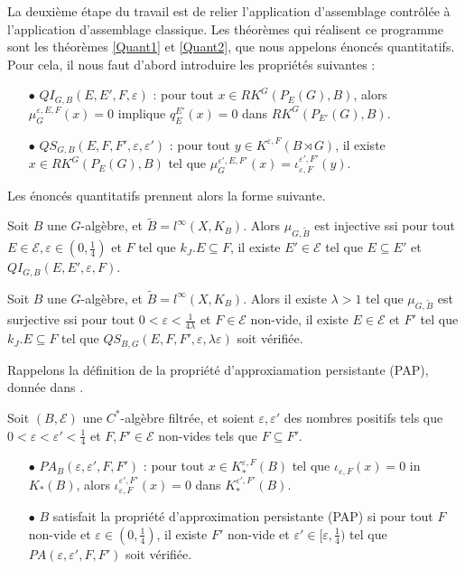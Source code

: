 La deuxième étape du travail est de relier l'application d'assemblage contrôlée à l'application d'assemblage classique. Les théorèmes qui réalisent ce programme sont les théorèmes \ref{Quant1} et \ref{Quant2}, que nous appelons énoncés quantitatifs. Pour cela, il nous faut d'abord introduire les propriétés suivantes :
\begin{itemize}
\item[$\bullet$] $QI_{G,B}(E,E',F,\varepsilon)$ : pour tout $x\in RK^G(P_E(G), B )$, alors $\mu^{\varepsilon,E,F}_G(x) = 0$ implique $q_E^{E'}(x)=0$ dans $RK^G(P_{E'}(G),B)$.
\item[$\bullet$] $QS_{G,B}(E,F,F',\varepsilon,\varepsilon')$ : pour tout $y\in K^{\varepsilon,F}(B\rtimes G)$, il existe $x\in RK^G(P_E(G),B)$ tel que $\mu^{\varepsilon',E,F'}_G(x)=\iota_{\varepsilon,F}^{\varepsilon',F'}(y)$.\\
\end{itemize} 

Les énoncés quantitatifs prennent alors la forme suivante.

\begin{thm}
Soit $B$ une $G$-algèbre, et $\tilde B = l^\infty(X,K_B)$. Alors $\mu_{G,\tilde B}$ est injective ssi pour tout $E\in\mathcal E,\varepsilon\in(0,\frac{1}{4})$ et $F$ tel que $k_J.E\subseteq F$, il existe $E' \in\mathcal E$ tel que $E\subseteq E'$ et $QI_{G,B}(E,E',\varepsilon,F)$. 
\end{thm}

\begin{thm}
Soit $B$ une $G$-algèbre, et $\tilde B = l^\infty(X,K_B)$. Alors il existe $\lambda>1$ tel que $\mu_{G,\tilde B}$ est surjective ssi pour tout $0<\varepsilon<\frac{1}{4\lambda}$ et $F\in\mathcal E$ non-vide, il existe $E\in\mathcal E$ et $F'$ tel que $k_J .E \subseteq F$ tel que $QS_{B,G}(E,F,F',\varepsilon,\lambda\varepsilon)$ soit vérifiée.
\end{thm}

Rappelons la définition de la propriété d'approxiamation persistante (PAP), donnée dans \cite{OY3}.

\begin{definition}
Soit $(B,\mathcal E)$ une $C^*$-algèbre filtrée, et soient $\varepsilon,\varepsilon'$ des nombres positifs tels que $0<\varepsilon <\varepsilon' <\frac{1}{4}$ et $F,F'\in\mathcal E$ non-vides tels que $F\subseteq F'$. 
\begin{itemize}
\item[$\bullet$] $PA_B(\varepsilon,\varepsilon',F,F')$ : pour tout $x\in K_*^{\varepsilon,F}(B)$ tel que $\iota_{\varepsilon,F}(x)=0$ in $K_*(B)$, alors $\iota_{\varepsilon,F}^{\varepsilon',F'}(x)=0$ dans $K_*^{\varepsilon',F'}(B)$.
\item[$\bullet$] $B$ satisfait la propriété d'approximation persistante (PAP) si pour tout $F$ non-vide et $\varepsilon\in (0,\frac{1}{4})$, il existe $F'$ non-vide et $\varepsilon'\in [\varepsilon,\frac{1}{4})$ tel que $PA(\varepsilon,\varepsilon',F,F')$ soit vérifiée.
\end{itemize}
\end{definition}

